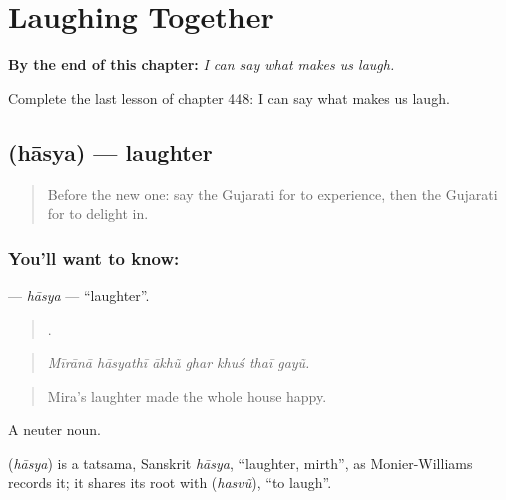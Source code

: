 
\chapter{Laughing Together}
\label{ch:gu-laughing-together}

\begin{chapteropening}
\textbf{By the end of this chapter:} \emph{I can say what makes us laugh.}

Complete the last lesson of chapter 448: I can say what makes us laugh.
\end{chapteropening}

\section[\texorpdfstring{\gu{હાસ્ય} (hāsya)}{હાસ્ય (hāsya)}]{ (hāsya) — laughter}

\label{lesson:GU-C448-hasya}



\begin{quote}
Before the new one: say the Gujarati for to experience, then the Gujarati for to delight in.
\end{quote}

\subsection*{You'll want to know: }
\textbf{} — \emph{hāsya} — \textquotedblleft{}laughter\textquotedblright{}.

\begin{quote}
      .
\end{quote}

\begin{quote}
\emph{Mīrānā hāsyathī ākhũ ghar khuś thaī gayũ.}
\end{quote}

\begin{quote}
Mira's laughter made the whole house happy.
\end{quote}

A neuter noun.

\begin{cousinweb}
\textbf{} (\emph{hāsya}) is a tatsama, Sanskrit \emph{hāsya}, \textquotedblleft{}laughter, mirth\textquotedblright{}, as Monier-Williams records it; it shares its root with \textbf{} (\emph{hasvũ}), \textquotedblleft{}to laugh\textquotedblright{}.
\end{cousinweb}

